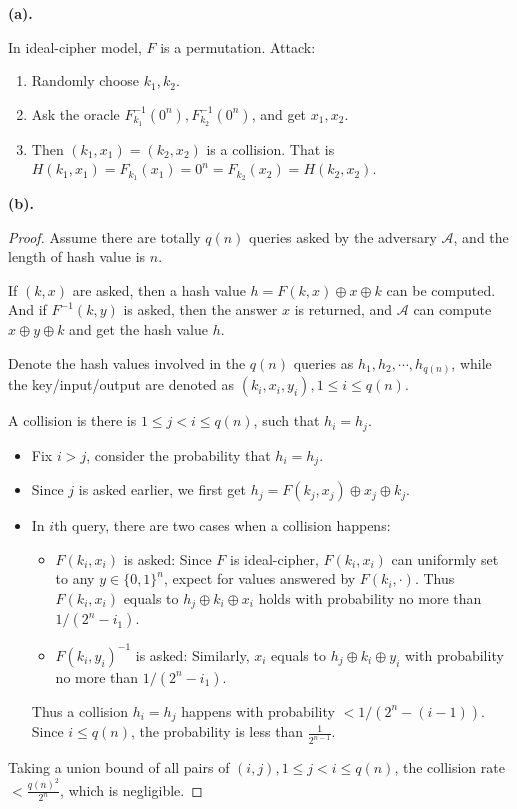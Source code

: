 \documentclass[a4paper]{article}
\newcommand{\A}{\mathcal{A}}
\newenvironment{problem}[2][Problem]{\begin{trivlist}
\item[\hskip \labelsep {\bfseries #1}\hskip \labelsep {\bfseries #2.}]}{\end{trivlist}}
\begin{document}
\begin{problem}{6.19}
\textbf{(a).}\par
In ideal-cipher model, $F$ is a permutation.
Attack:\begin{enumerate}
    \item Randomly choose $k_1,k_2$.
    \item Ask the oracle $F_{k_1}^{-1}(0^n),F_{k_2}^{-1}(0^n)$, and get $x_1,x_2$.
    \item Then $(k_1,x_1)=(k_2,x_2)$ is a collision. That is $H(k_1,x_1)=F_{k_1}(x_1)=0^n=F_{k_2}(x_2)=H(k_2,x_2)$.
\end{enumerate}
\par\vspace{3ex}

\textbf{(b).}\par
\begin{proof}
Assume there are totally $q(n)$ queries asked by the adversary $\A$, and the length of hash value is $n$.\par
If $(k,x)$ are asked, then a hash value $h=F(k,x)\oplus x\oplus k$ can be computed. And if $F^{-1}(k,y)$ is asked, then the answer $x$ is returned, and $\A$ can compute $x\oplus y\oplus k$ and get the hash value $h$. \par 
Denote the hash values involved in the $q(n)$ queries as $h_1,h_2,\cdots,h_{q(n)}$, while the key/input/output are denoted as $(k_i,x_i,y_i),1\le i\le q(n)$.\par
A collision is there is $1\le j<i\le q(n)$, such that $h_i=h_j$. 
\begin{itemize}
    \item Fix $i>j$, consider the probability that $h_i=h_j$. 
    \item Since $j$ is asked earlier, we first get $h_j=F(k_j,x_j)\oplus x_j\oplus k_j$.
    \item In $i$th query, there are two cases when a collision happens:
    \begin{itemize}
        \item $F(k_i,x_i)$ is asked: Since $F$ is ideal-cipher, $F(k_i,x_i)$ can uniformly set to any $y\in\{0,1\}^n$, expect for values answered by $F(k_i,\cdot)$. Thus $F(k_i,x_i)$ equals to $h_j\oplus k_i\oplus x_i$ holds with probability no more than $1/(2^n-i_1)$. 
        \item $F(k_i,y_i)^{-1}$ is asked: Similarly, $x_i$ equals to $h_j\oplus k_i\oplus y_i$ with probability no more than $1/(2^n-i_1)$.  
    \end{itemize}
    Thus a collision $h_i=h_j$ happens with probability $<1/(2^n-(i-1))$. Since $i\le q(n)$, the probability is less than $\frac{1}{2^{n-1}}$.
\end{itemize}\par
Taking a union bound of all pairs of $(i,j),1\le j<i\le q(n)$, the collision rate $<\frac{q(n)^2}{2^n}$, which is negligible.
\end{proof}
\par\vspace{3ex}


\end{problem}
\end{document}

